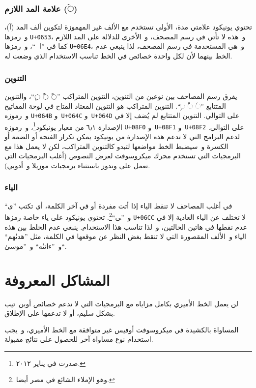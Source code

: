 \documentclass[a4paper]{article}
\renewcommand\U[1]{\colorbox{codecolor}{\texttt{U+#1}}} %
\begin{document}
\subsubsection{علامة المد اللازم (\textup{\arabicfont ◌ۤ})}
تحتوي يونيكود علامتي مدة، الأولى تستخدم مع الألف غير المهموزة لتكوين ألف
المد (آ)، و رمزها \U{0653}، و هذه لا تأتي في رسم المصحف، و الأخرى
للدلالة على المد اللازم كما في ”الۤمۤ“، و رمزها \U{06E4}، و هي
المستخدمة في رسم المصحف، لذا ينبغي عدم الخط بينهما لأن لكل واحدة خصائص
في الخط تناسب الاستخدام الذي وضعت له.

\subsubsection{التنوين}
يفرق رسم المصاحف بين نوعين من التنوين، التنوين المتراكب ”◌ً ◌ٌ ◌ٍ“،
والتنوين المتتابع ”◌ࣰ ◌ࣱ ◌ࣲ“. التنوين المتراكب هو التنوين المعتاد المتاح
في لوحة المفاتيح و رموزه \U{064B} و \U{064C}
و \U{064D} على التوالي. التنوين المتتابع لم يُضف إلا في الإصدارة
٦٫١ من معيار يونيكود\footnote{صدرت في يناير ٢٠١٢.}، و رموزه
\U{08F0} و \U{08F1} و \U{08F2} على التوالي. لدعم
البرامج التي لا تدعم هذه الإصدارة من يونيكود يمكن تكرار الفتحة أو الضمة
أو الكسرة و سيضبط الخط مواضعها لتبدو كالتنوين المتراكب، لكن لا يعمل هذا
مع البرمجيات التي تستخدم محرك ميكروسوفت لعرض النصوص (أغلب البرمجيات التي
تعمل على وندوز باستثناء برمجيات موزيلا و أدوبي).

\subsubsection{الياء}
في أغلب المصاحف لا تنقط الياء إذا أتت مفردة أو في آخر الكلمة، أي تكتب
”ی“ و ”‍ی“\footnote{وهو الإملاء الشائع في مصر أيضا.}. تحتوي يونيكود
على ياء خاصة رمزها \U{06CC} لا تختلف عن الياء العادية إلا في عدم
نقطها في هاتين الحالتين، و لذا تناسب هذا الاستخدام. ينبغي عدم الخلط بين
هذه الياء و الألف المقصورة التي لا تنقط بغض النظر عن موقعها في الكلمة،
مثل ”هدىٰهم“ و ”ءاتىٰه“ و ”موسىٰ“.


\section{المشاكل المعروفة}

لن يعمل الخط الأميري بكامل مزاياه مع البرمجيات التي لا تدعم خصائص أوبن تيب بشكل
سليم، أو لا تدعمها على الإطلاق.

المساواة بالكشيدة في ميكروسوفت أوفيس غير متوافقة مع الخط الأميري، و يجب استخدام
نوع مساواة آخر للحصول على نتائج مقبولة.

\end{document}
